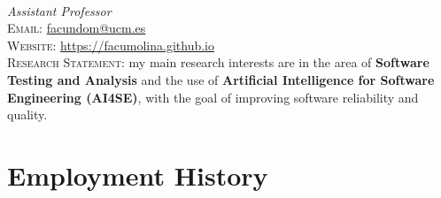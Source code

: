 \documentclass[a4paper,10pt]{article} %
\begin{document}
\pagestyle{empty} %


{} \\
\textit{Assistant Professor} \\
\textsc{Email:} \href{mailto:facundom@ucm.es}{facundom@ucm.es} \\
\textsc{Website:} \href{https://facumolina.github.io}{https://facumolina.github.io} \\

{\raggedleft
\textsc{Research Statement:} my main research interests are in the area of \textbf{Software Testing and Analysis} and the use of \textbf{Artificial Intelligence for Software Engineering (AI4SE)}, with the goal of improving software reliability and quality.} \\

\section{Employment History}
\end{document}
